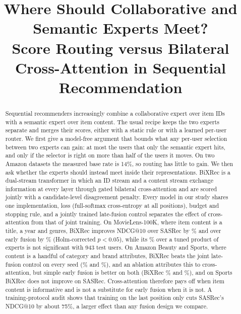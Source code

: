 \documentclass[conference]{IEEEtran}
\begin{document}
\title{Where Should Collaborative and Semantic Experts Meet?\\
Score Routing versus Bilateral Cross-Attention in Sequential Recommendation}

\author{}

\maketitle

\begin{abstract}
Sequential recommenders increasingly combine a collaborative expert over item IDs with a semantic expert over item
content. The usual recipe keeps the two experts separate and merges their scores, either with a static rule or with
a learned per-user router. We first give a model-free argument that bounds what any per-user selection between two
experts can gain: at most the users that only the semantic expert hits, and only if the selector is right on more
than half of the users it moves. On two Amazon datasets the measured base rate is 14\%, so routing has little to
gain. We
then ask whether the experts should instead meet inside their representations. BiXRec is a dual-stream transformer
in which an ID stream and a content stream exchange information at every layer through gated bilateral
cross-attention and are scored jointly with a candidate-level disagreement penalty. Every model in our study shares
one implementation, loss (full-softmax cross-entropy at all positions), budget and stopping rule, and a jointly
trained late-fusion control separates the effect of cross-attention from that of joint training. On MovieLens-100K,
where item content is a title, a year and genres, BiXRec improves NDCG@10 over SASRec by \gainMlHundredSasrec\% and
over early fusion by \gainMlHundredHybrid\% (Holm-corrected $p<0.05$), while its \gainMlHundredPoe\% over a tuned
product of experts is not significant with 943 test users. On Amazon Beauty and Sports, where content is a
handful of category and brand attributes, BiXRec beats the joint late-fusion control on every seed
(\gainBeautyLate\% and \gainSportsLate\%), and an ablation attributes this to cross-attention, but simple early
fusion is better on both (BiXRec \gainBeautyHybrid\% and \gainSportsHybrid\%), and on Sports BiXRec does not
improve on SASRec. Cross-attention therefore
pays off when item content is informative and is not a substitute for early fusion when it is not. A
training-protocol audit shows that training on the last position only cuts SASRec's NDCG@10 by about 75\%, a
larger effect than any fusion design we compare.
\end{abstract}
\end{document}
